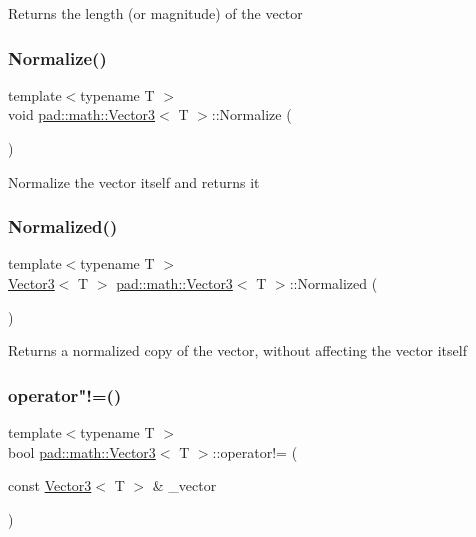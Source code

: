 Returns the length (or magnitude) of the vector \mbox{\label{structpad_1_1math_1_1_vector3_a76c70ba64ff0c1b27e26d444bfdd3de5}} 
\subsubsection{\texorpdfstring{Normalize()}{Normalize()}}
{\footnotesize\ttfamily template$<$typename T $>$ \\
void \mbox{\hyperlink{structpad_1_1math_1_1_vector3}{pad\+::math\+::\+Vector3}}$<$ T $>$\+::Normalize (\begin{DoxyParamCaption}{ }\end{DoxyParamCaption})}

Normalize the vector itself and returns it \mbox{\label{structpad_1_1math_1_1_vector3_a1eeab221ba8b7ea8d0a7d1da8b404037}} 
\subsubsection{\texorpdfstring{Normalized()}{Normalized()}}
{\footnotesize\ttfamily template$<$typename T $>$ \\
\mbox{\hyperlink{structpad_1_1math_1_1_vector3}{Vector3}}$<$ T $>$ \mbox{\hyperlink{structpad_1_1math_1_1_vector3}{pad\+::math\+::\+Vector3}}$<$ T $>$\+::Normalized (\begin{DoxyParamCaption}{ }\end{DoxyParamCaption})}

Returns a normalized copy of the vector, without affecting the vector itself \mbox{\label{structpad_1_1math_1_1_vector3_a3f24df3c362f90ca6a02bfb40ccd6882}} 
\subsubsection{\texorpdfstring{operator"!=()}{operator!=()}}
{\footnotesize\ttfamily template$<$typename T $>$ \\
bool \mbox{\hyperlink{structpad_1_1math_1_1_vector3}{pad\+::math\+::\+Vector3}}$<$ T $>$\+::operator!= (\begin{DoxyParamCaption}\item[{const \mbox{\hyperlink{structpad_1_1math_1_1_vector3}{Vector3}}$<$ T $>$ \&}]{\+\_\+vector }\end{DoxyParamCaption})}

